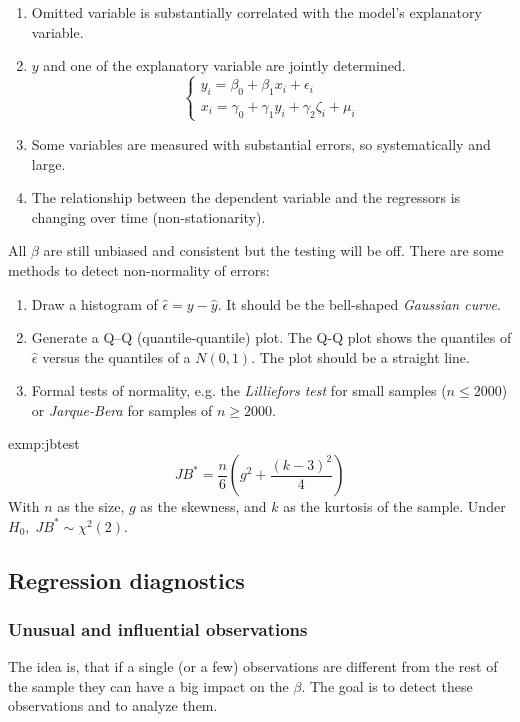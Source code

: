 		\begin{enumerate}
			\item Omitted variable is substantially correlated with the model's explanatory variable.
			\item $y$ and one of the explanatory variable are jointly determined.
				\begin{equation*}
					\begin{cases}
					y_i=\beta_0+\beta_1 x_i + \epsilon_i\\
					x_i=\gamma_0+\gamma_1 y_i + \gamma_2 \zeta_i + \mu_i
					\end{cases}
				\end{equation*}
			\item Some variables are measured with substantial errors, so systematically and large.
			\item The relationship between the dependent variable and the regressors is changing over time (non-stationarity).
		\end{enumerate} 
		All $\beta$ are still unbiased and consistent but the testing will be off. There are some methods to detect non-normality of errors:
		\begin{enumerate}
			\item Draw a histogram of $\hat{\epsilon}=y-\hat{y}$. It should be the bell-shaped \emph{Gaussian curve}.
			\item Generate a Q–Q (quantile-quantile) plot. The Q-Q plot shows the quantiles of $\hat{\epsilon}$ versus the quantiles of a $N(0,1)$. The plot should be a straight line.
			\item Formal tests of normality, e.g. the \emph{Lilliefors test} for small samples ($n\leq 2000$) or \emph{Jarque-Bera} for samples of $n\geq 2000$.
		\end{enumerate}
		\begin{exmp}{exmp:jbtest}
			\begin{equation*}
				JB^*=\frac{n}{6}\left(g^2+\frac{(k-3)^2}{4}\right)
			\end{equation*}
			With $n$ as the size, $g$ as the skewness, and $k$ as the kurtosis of the sample. Under $H_0,\;JB^*\sim \chi^2(2)$.
		\end{exmp}
\subsection{Regression diagnostics}
 \subsubsection{Unusual and influential observations}
		The idea is, that if a single (or a few) observations are different from the rest of the sample they can have a big impact on the $\beta$. The goal is to detect these observations and to analyze them.
		
